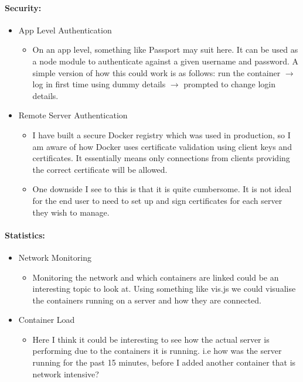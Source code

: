 \documentclass{article}
\begin{document}
\paragraph{Security:}
\begin{itemize}
	\item App Level Authentication
	\begin{itemize}
		\item On an app level, something like Passport may suit here. It can be used as a node module to authenticate against a given username and password. A simple version of how this could work is as follows: run the container $ \rightarrow $ log in first time using dummy details $ \rightarrow $ prompted to change login details. 
	\end{itemize}
	\item Remote Server Authentication
	\begin{itemize}
		\item I have built a secure Docker registry which was used in production, so I am aware of how Docker uses certificate validation using client keys and certificates. It essentially means only connections from clients providing the correct certificate will be allowed.
		\item One downside I see to this is that it is quite cumbersome. It is not ideal for the end user to need to set up and sign certificates for each server they wish to manage.
	\end{itemize}
\end{itemize}

\paragraph{Statistics:}
\begin{itemize}
	\item Network Monitoring
	\begin{itemize}
		\item Monitoring the network and which containers are linked could be an interesting topic to look at. Using something like
    vis.js we could visualise the containers running on a server and how they are connected.
	\end{itemize}
	\item Container Load
	\begin{itemize}
		\item Here I think it could be interesting to see how the actual server is performing due to the containers it is running. i.e how was the server running for the past 15 minutes, before I added another container that is network intensive?
	\end{itemize}
\end{itemize}
\end{document}
